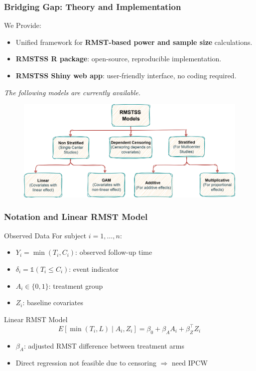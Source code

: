 \documentclass{beamer}
\begin{document}
\begin{frame}
\frametitle{Bridging Gap: Theory and Implementation}

\begin{block}{We Provide:}
\scriptsize
\begin{itemize}
  \item Unified framework for \textbf{RMST-based power and sample size} calculations.
  \item \textbf{RMSTSS R package}: open-source, reproducible implementation.
  \item \textbf{RMSTSS Shiny web app}: user-friendly interface, no coding required.
\end{itemize}
\end{block}
\textit{The following models are currently available.}
\begin{figure}
    \centering
    \includegraphics[width=1\linewidth]{images/app-models.png}
\end{figure}
\end{frame}



\begin{frame}
\frametitle{Notation and Linear RMST Model}

\begin{block}{Observed Data}
For subject $i=1,\dots,n$:  
\begin{itemize}
  \item $Y_i = \min(T_i, C_i)$: observed follow-up time  
  \item $\delta_i = \mathbb{1}(T_i \le C_i)$: event indicator  
  \item $A_i \in \{0,1\}$: treatment group  
  \item $Z_i$: baseline covariates
\end{itemize}
\end{block}

\begin{block}{Linear RMST Model}
\[
E[\min(T_i,L) \mid A_i, Z_i] = \beta_0 + \beta_A A_i + \beta_Z^\top Z_i
\]

\begin{itemize}
  \item $\beta_A$: adjusted RMST difference between treatment arms  
  \item Direct regression not feasible due to censoring $\Rightarrow$ need IPCW
\end{itemize}
\end{block}

\end{frame}
\end{document}

